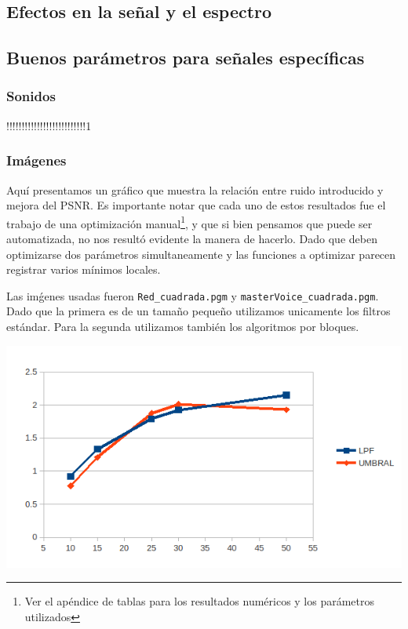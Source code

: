 \subsection{Efectos en la se\~nal y el espectro}

\subsection{Buenos par\'ametros para se\~nales espec\'ificas}

\subsubsection{Sonidos}

!!!!!!!!!!!!!!!!!!!!!!!!!!1

\subsubsection{Im\'agenes}

Aqu\'i presentamos un gr\'afico que muestra la relaci\'on entre
ruido introducido y mejora del PSNR.
Es importante notar que cada uno de estos resultados fue el trabajo
de una optimizaci\'on manual\footnote{Ver el ap\'endice de tablas
para los resultados num\'ericos y los par\'ametros utilizados},
y que si bien pensamos que puede
ser automatizada, no nos result\'o evidente la manera de hacerlo.
Dado que deben optimizarse dos par\'ametros simultaneamente y
las funciones a optimizar parecen registrar varios m\'inimos
locales.

Las im\'genes usadas fueron \texttt{Red\_cuadrada.pgm} y
\texttt{masterVoice\_cuadrada.pgm}.
Dado que la primera es de un tama\~no peque\~no utilizamos
unicamente los filtros est\'andar. Para la segunda utilizamos
tambi\'en los algoritmos por bloques.

\includegraphics[width=14cm]{red_psnr.png}

